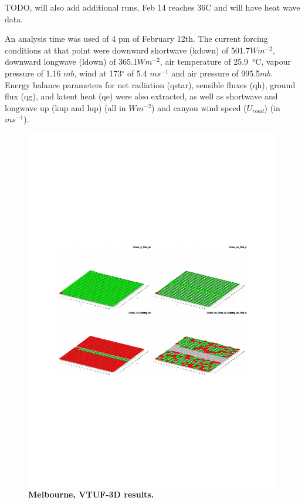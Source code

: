 \documentclass[final,3p,times,authoryear]{elsarticle}
\begin{document}
TODO, will also add additional runs, Feb 14 reaches 36C and will have heat wave data.

An analysis time was used of  4 pm of February 12th. The current forcing conditions at that point were downward shortwave (\gls{kdown}) of 501.7$Wm^{-2}$, downward longwave (\gls{ldown}) of 365.1$Wm^{-2}$, air temperature of 25.9\SI{}{\degreeCelsius}, vapour pressure of 1.16 $mb$, wind at 173$^{\circ}$ of 5.4 $ms^{-1}$ and air pressure of 995.5$mb$. Energy balance parameters for net radiation (\gls{qstar}), sensible fluxes (\gls{qh}), ground flux (\gls{qg}), and latent heat (\gls{qe}) were also extracted, as well as shortwave and longwave up (\gls{kup} and \gls{lup}) (all in $Wm^{-2}$) and canyon wind speed ($U_{road}$) (in $ms^{-1}$).

\begin{figure}
\centering
\includegraphics[page=2,trim={75 240 60 240},clip,scale=0.55]{Figures/PresentationImages.pdf}
\caption{\bf Melbourne, VTUF-3D results.}
 \label{fig:vtufresults}
\end{figure} 
\end{document}
